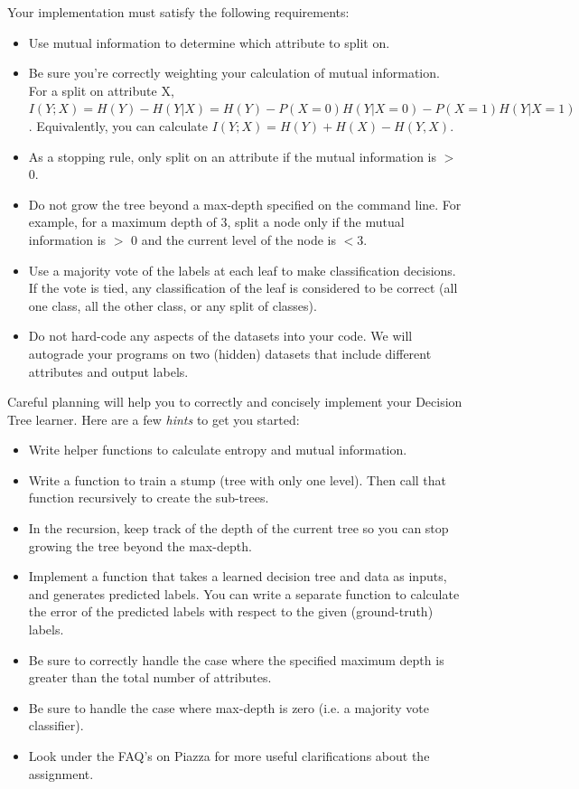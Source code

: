 \documentclass[11pt]{article}
\numberwithin{equation}{section} %
\numberwithin{figure}{section} %
\numberwithin{table}{section} %
\begin{document}
Your implementation must satisfy the following requirements:
\begin{itemize}
\item Use mutual information to determine which attribute to split on.
\item Be sure you're correctly weighting your calculation of mutual information. For a split on attribute X, $I(Y;X)=H(Y)-H(Y|X)=H(Y)-P(X =0)H(Y|X =0)-P(X =1)H(Y|X =1)$.  Equivalently, you can calculate $I (Y ; X ) = H (Y ) + H (X ) - H (Y , X )$.
\item As a stopping rule, only split on an attribute if the mutual information is $>$ 0.
\item Do not grow the tree beyond a max-depth specified on the command line. For example, for a maximum depth of 3, split a node only if the mutual information is $>$ 0 and the current level of the node is $< 3$.
\item Use a majority vote of the labels at each leaf to make classification decisions. If the vote is tied, any classification of the leaf is considered to be correct (all one class, all the other class, or any split of classes).
\item Do not hard-code any aspects of the datasets into your code. We will autograde your programs on two (hidden) datasets that include different attributes and output labels.
\end{itemize}

Careful planning will help you to correctly and concisely implement your Decision Tree learner. Here are a few \emph{hints} to get you started:
\begin{itemize}
    \item Write helper functions to calculate entropy and mutual information.
    \item Write a function to train a stump (tree with only one level). Then call that function recursively to create the sub-trees.
    \item In the recursion, keep track of the depth of the current tree so you can stop growing the tree beyond the max-depth.
    \item Implement a function that takes a learned decision tree and data as inputs, and generates predicted labels. You can write a separate function to calculate the error of the predicted labels with respect to the given (ground-truth) labels.
    \item Be sure to correctly handle the case where the specified maximum depth is greater than the total number of attributes.
    \item Be sure to handle the case where max-depth is zero (i.e. a majority vote classifier). 
    \item Look under the FAQ's on Piazza for more useful clarifications about the assignment.
\end{itemize}
\end{document}
